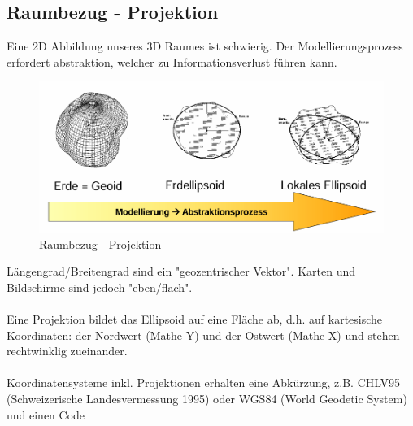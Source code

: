 \documentclass[../Main.tex]{subfiles}
\begin{document}

\subsection{Raumbezug - Projektion}
Eine 2D Abbildung unseres 3D Raumes ist schwierig.
Der Modellierungsprozess erfordert abstraktion, welcher zu Informationsverlust führen kann.

\begin{figure}[H]
    \centering
    \includegraphics[width=0.75\linewidth]{Images/raumbezug.png}
    \caption{Raumbezug - Projektion}
\end{figure}
Längengrad/Breitengrad sind ein "geozentrischer 
Vektor". Karten und Bildschirme sind jedoch 
"eben/flach".
\\\\
Eine Projektion bildet das Ellipsoid auf eine Fläche 
ab, d.h. auf kartesische Koordinaten: der Nordwert 
(Mathe Y) und der Ostwert (Mathe X) und stehen 
rechtwinklig zueinander.
\\\\
Koordinatensysteme inkl. Projektionen erhalten 
eine Abkürzung, z.B. CHLV95 (Schweizerische 
Landesvermessung 1995) oder WGS84 (World 
Geodetic System) und einen Code
\end{document}
